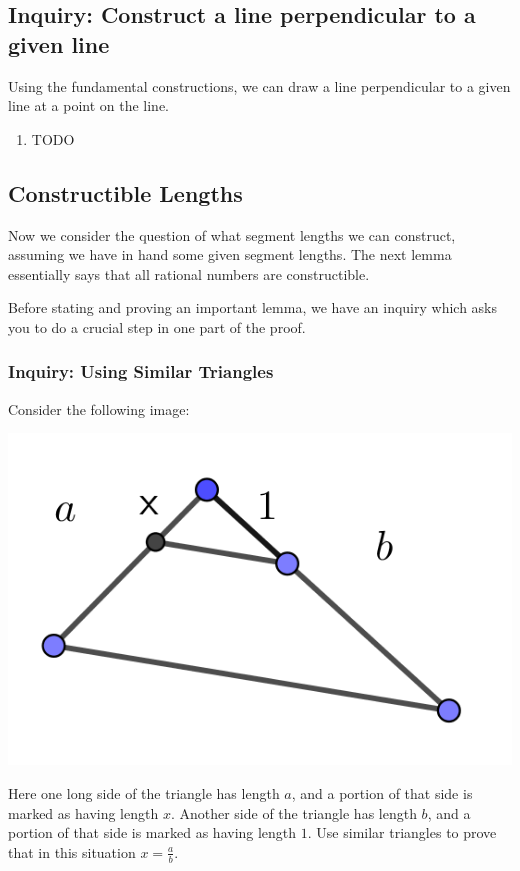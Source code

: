 \documentclass[11pt]{article}
\newenvironment{task}
	{\begin{mdframed}[linecolor=lightgray, linewidth=3pt]\raggedright}
	{\end{mdframed}}
\theoremstyle{definition}
\begin{document}
\subsection{Inquiry: Construct a line perpendicular to a given line}
\begin{task}
  Using the fundamental constructions, we can draw a line perpendicular to a given line at a point on the line.

  \begin{enumerate}
    \item TODO
  \end{enumerate}
\end{task}

\subsection{Constructible Lengths}

Now we consider the question of what segment lengths we can construct, assuming we have in hand some given segment lengths. The next lemma essentially
says that all rational numbers are constructible.

Before stating and proving an important lemma, we have an inquiry which asks you to do a crucial step in one part of the proof.

\subsubsection{Inquiry: Using Similar Triangles}
\begin{task}
  Consider the following image:
  \begin{center}
    \includegraphics[scale=.1]{Images/a_over_b.png}
  \end{center}
  Here one long side of the triangle has length $a$, and a portion of that side is marked as having length $x$. Another side of the
  triangle has length $b$, and a portion of that side is marked as having length $1$. Use similar triangles to prove that in this situation $x = \frac{a}{b}$.
\end{task}
\end{document}
